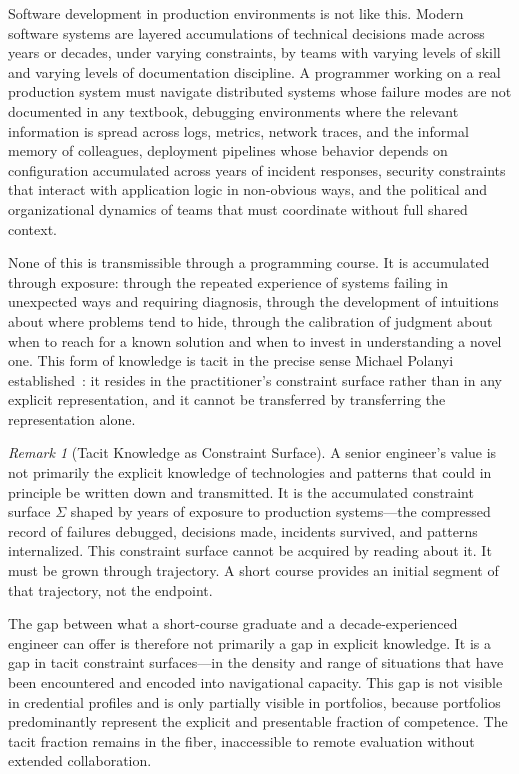\documentclass[12pt, a4paper]{article}
\theoremstyle{plain}
\theoremstyle{definition}
\theoremstyle{remark}
\newtheorem{remark}[proposition]{Remark}
\begin{document}
Software development in production environments is not like this.
Modern software systems are layered accumulations of technical decisions
made across years or decades, under varying constraints, by teams with varying
levels of skill and varying levels of documentation discipline.
A programmer working on a real production system must navigate distributed systems
whose failure modes are not documented in any textbook,
debugging environments where the relevant information is spread across
logs, metrics, network traces, and the informal memory of colleagues,
deployment pipelines whose behavior depends on configuration accumulated
across years of incident responses,
security constraints that interact with application logic in non-obvious ways,
and the political and organizational dynamics of teams that must coordinate
without full shared context.

None of this is transmissible through a programming course.
It is accumulated through exposure: through the repeated experience of
systems failing in unexpected ways and requiring diagnosis,
through the development of intuitions about where problems tend to hide,
through the calibration of judgment about when to reach for a known solution
and when to invest in understanding a novel one.
This form of knowledge is tacit in the precise sense Michael Polanyi established~\cite{polanyi1966}:
it resides in the practitioner's constraint surface rather than in any explicit representation,
and it cannot be transferred by transferring the representation alone.

\begin{remark}[Tacit Knowledge as Constraint Surface]
A senior engineer's value is not primarily the explicit knowledge of technologies
and patterns that could in principle be written down and transmitted.
It is the accumulated constraint surface $\Sigma$ shaped by years of
exposure to production systems---the compressed record of failures debugged,
decisions made, incidents survived, and patterns internalized.
This constraint surface cannot be acquired by reading about it.
It must be grown through trajectory.
A short course provides an initial segment of that trajectory,
not the endpoint.
\end{remark}

The gap between what a short-course graduate and a decade-experienced engineer
can offer is therefore not primarily a gap in explicit knowledge.
It is a gap in tacit constraint surfaces---in the density and range
of situations that have been encountered and encoded into navigational capacity.
This gap is not visible in credential profiles and is only partially visible
in portfolios, because portfolios predominantly represent
the explicit and presentable fraction of competence.
The tacit fraction remains in the fiber,
inaccessible to remote evaluation without extended collaboration.
\end{document}
